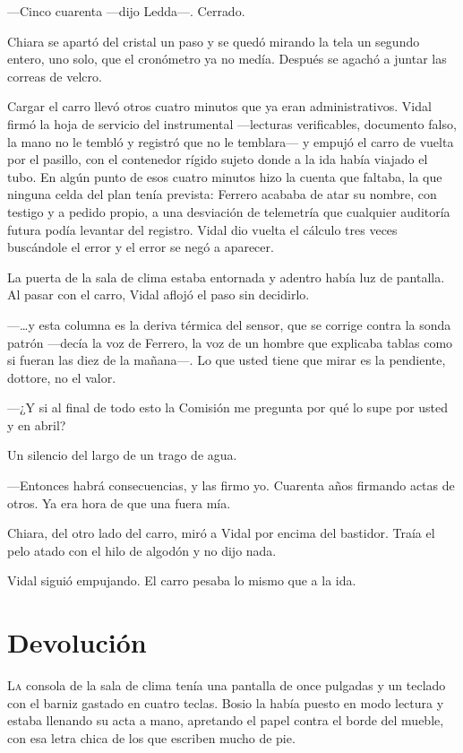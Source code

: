 ---Cinco cuarenta ---dijo Ledda---. Cerrado.

Chiara se apartó del cristal un paso y se quedó mirando la tela un segundo entero, uno solo, que el cronómetro ya no medía. Después se agachó a juntar las correas de velcro.

Cargar el carro llevó otros cuatro minutos que ya eran administrativos. Vidal firmó la hoja de servicio del instrumental ---lecturas verificables, documento falso, la mano no le tembló y registró que no le temblara--- y empujó el carro de vuelta por el pasillo, con el contenedor rígido sujeto donde a la ida había viajado el tubo. En algún punto de esos cuatro minutos hizo la cuenta que faltaba, la que ninguna celda del plan tenía prevista: Ferrero acababa de atar su nombre, con testigo y a pedido propio, a una desviación de telemetría que cualquier auditoría futura podía levantar del registro. Vidal dio vuelta el cálculo tres veces buscándole el error y el error se negó a aparecer.

La puerta de la sala de clima estaba entornada y adentro había luz de pantalla. Al pasar con el carro, Vidal aflojó el paso sin decidirlo.

---\ldots{}y esta columna es la deriva térmica del sensor, que se corrige contra la sonda patrón ---decía la voz de Ferrero, la voz de un hombre que explicaba tablas como si fueran las diez de la mañana---. Lo que usted tiene que mirar es la pendiente, dottore, no el valor.

---¿Y si al final de todo esto la Comisión me pregunta por qué lo supe por usted y en abril?

Un silencio del largo de un trago de agua.

---Entonces habrá consecuencias, y las firmo yo. Cuarenta años firmando actas de otros. Ya era hora de que una fuera mía.

Chiara, del otro lado del carro, miró a Vidal por encima del bastidor. Traía el pelo atado con el hilo de algodón y no dijo nada.

Vidal siguió empujando. El carro pesaba lo mismo que a la ida.

\clearpage

\chapter{Devolución}

\lettrine[lines=2, lhang=0.1, nindent=0.2em]{L}{a} consola de la sala de clima tenía una pantalla de once pulgadas y un teclado con el barniz gastado en cuatro teclas. Bosio la había puesto en modo lectura y estaba llenando su acta a mano, apretando el papel contra el borde del mueble, con esa letra chica de los que escriben mucho de pie.



